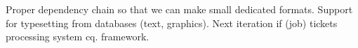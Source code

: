     \stopitemize

\stopsubject

\startsubject[title=What I'm working on]

    \startitemize[packed]

        \startitem Proper dependency chain so that we can make small dedicated formats. \stopitem \FlushStep
        \startitem Support for typesetting from databases (text, graphics). \stopitem \FlushStep
        \startitem Next iteration if (job) tickets processing system cq. framework. \stopitem \FlushStep

    \stopitemize

\stopsubject

\StopSteps


\stopdocument
